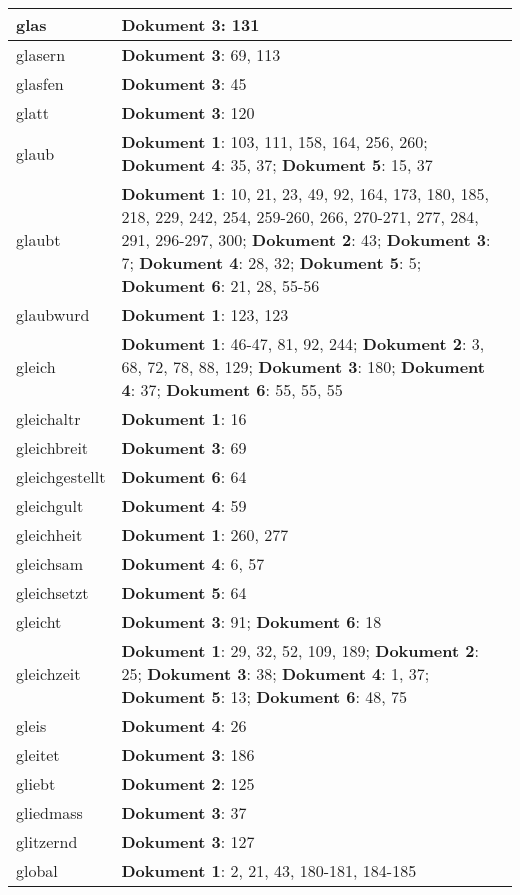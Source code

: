 \documentclass[a5paper]{article}
\begin{document}
\begin{longtable}[l]{|l|p{3in}|}
\hline
glas & \textbf{Dokument 3}: 131 \\
\hline
glasern & \textbf{Dokument 3}: 69, 113 \\
\hline
glasfen & \textbf{Dokument 3}: 45 \\
\hline
glatt & \textbf{Dokument 3}: 120 \\
\hline
glaub & \textbf{Dokument 1}: 103, 111, 158, 164, 256, 260; \textbf{Dokument 4}: 35, 37; \textbf{Dokument 5}: 15, 37 \\
\hline
glaubt & \textbf{Dokument 1}: 10, 21, 23, 49, 92, 164, 173, 180, 185, 218, 229, 242, 254, 259-260, 266, 270-271, 277, 284, 291, 296-297, 300; \textbf{Dokument 2}: 43; \textbf{Dokument 3}: 7; \textbf{Dokument 4}: 28, 32; \textbf{Dokument 5}: 5; \textbf{Dokument 6}: 21, 28, 55-56 \\
\hline
glaubwurd & \textbf{Dokument 1}: 123, 123 \\
\hline
gleich & \textbf{Dokument 1}: 46-47, 81, 92, 244; \textbf{Dokument 2}: 3, 68, 72, 78, 88, 129; \textbf{Dokument 3}: 180; \textbf{Dokument 4}: 37; \textbf{Dokument 6}: 55, 55, 55 \\
\hline
gleichaltr & \textbf{Dokument 1}: 16 \\
\hline
gleichbreit & \textbf{Dokument 3}: 69 \\
\hline
gleichgestellt & \textbf{Dokument 6}: 64 \\
\hline
gleichgult & \textbf{Dokument 4}: 59 \\
\hline
gleichheit & \textbf{Dokument 1}: 260, 277 \\
\hline
gleichsam & \textbf{Dokument 4}: 6, 57 \\
\hline
gleichsetzt & \textbf{Dokument 5}: 64 \\
\hline
gleicht & \textbf{Dokument 3}: 91; \textbf{Dokument 6}: 18 \\
\hline
gleichzeit & \textbf{Dokument 1}: 29, 32, 52, 109, 189; \textbf{Dokument 2}: 25; \textbf{Dokument 3}: 38; \textbf{Dokument 4}: 1, 37; \textbf{Dokument 5}: 13; \textbf{Dokument 6}: 48, 75 \\
\hline
gleis & \textbf{Dokument 4}: 26 \\
\hline
gleitet & \textbf{Dokument 3}: 186 \\
\hline
gliebt & \textbf{Dokument 2}: 125 \\
\hline
gliedmass & \textbf{Dokument 3}: 37 \\
\hline
glitzernd & \textbf{Dokument 3}: 127 \\
\hline
global & \textbf{Dokument 1}: 2, 21, 43, 180-181, 184-185 \\

\end{longtable}
\end{document}
